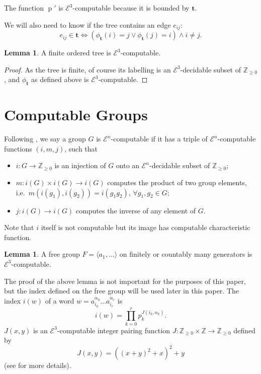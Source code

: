 \documentclass[a4paper]{article}
\newcommand{\grz}[1]{$\mathcal{E}^{#1}$}	%
\newcommand{\ZZ}{\mathbb{Z}}
\newcommand{\tvec}{\mathbf{t}}	%
\theoremstyle{plain}
\theoremstyle{definition}
\newtheorem{lemma}[theorem]{Lemma}
\begin{document}
The function $\operatorname{p}'$ is \grz{3}-computable because it is bounded by $\tvec$.

We will also need to know if the tree contains an edge $e_{ij}$:
\begin{equation} e_{ij} \in \tvec \Leftrightarrow \left ( \phi_{\tvec}(i) = j \vee \phi_{\tvec}(j) = i \right ) \wedge i \neq j. \end{equation}


\begin{lemma}
A finite ordered tree is \grz{3}-computable.
\end{lemma}

\begin{proof}
	As the tree is finite, of course its labelling is an \grz{3}-decidable subset of $\ZZ_{\geq 0}$, and $\phi_{\tvec}$ as defined above is \grz{3}-computable.
\end{proof}

\section{Computable Groups \label{groups}}

Following \cite{Cannonito_1966}, we say a group $G$ is \grz{n}-computable if it has a triple of \grz{n}-computable functions $(i,m,j)$, such that

\begin{itemize}
	\item $i: G \rightarrow \ZZ_{\geq 0}$ is an injection of $G$ onto an \grz{n}-decidable subset of $\ZZ_{\geq 0}$;
	\item $m: i(G) \times i(G) \rightarrow i(G)$ computes the product of two group elements, i.e.\ $m \left(i(g_1),i(g_2)\right) = i(g_1g_2)$, $\forall g_1,g_2 \in G$;
	\item $j: i(G) \rightarrow i(G)$ computes the inverse of any element of $G$.
\end{itemize}

Note that $i$ itself is not computable but its image has computable characteristic function.

\begin{lemma}\cite[Lemma 3.1]{Cannonito_1973} \label{freegroupindex}
	A free group $F = \langle a_1, \dots \rangle$ on finitely or countably many generators is \grz{3}-computable.
\end{lemma}

The proof of the above lemma is not important for the purposes of this paper, but the index defined on the free group will be used later in this paper. The index $i(w)$ of a word $w = a_{i_0}^{\alpha_0} \dots a_{i_r}^{\alpha_r}$ is
\[ i(w) = \prod_{k=0}^r p_k^{J(i_k,\alpha_k)}. \]
$J(x,y)$ is an \grz{3}-computable integer pairing function $J:\ZZ_{\geq 0} \times \ZZ \rightarrow \ZZ_{\geq 0}$ defined by 
\[J(x,y)=((x+y)^2+x)^2+y\]
(see \cite{Cannonito_1973} for more details).
\end{document}
